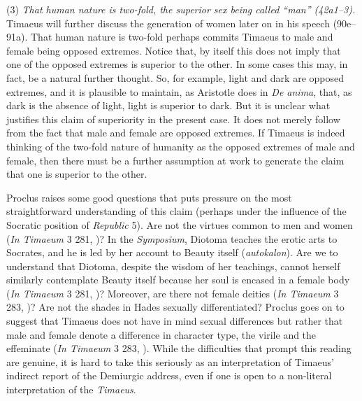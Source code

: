 (3) \emph{That human nature is two-fold, the superior sex being called ``man'' (42a1--3).} Timaeus will further discuss the generation of women later on in his speech (90e--91a). That human nature is two-fold perhaps commits Timaeus to male and female being opposed extremes. Notice that, by itself this does not imply that one of the opposed extremes is superior to the other. In some cases this may, in fact, be a natural further thought. So, for example, light and dark are opposed extremes, and it is plausible to maintain, as Aristotle does in \emph{De anima}, that, as dark is the absence of light, light is superior to dark. But it is unclear what justifies this claim of superiority in the present case. It does not merely follow from the fact that male and female are opposed extremes. If Timaeus is indeed thinking of the two-fold nature of humanity as the opposed extremes of male and female, then there must be a further assumption at work to generate the claim that one is superior to the other.

Proclus raises some good questions that puts pressure on the most straightforward understanding of this claim (perhaps under the influence of the Socratic position of \emph{Republic} 5). Are not the virtues common to men and women (\emph{In Timaeum} 3 281, \citealt{Diehl:1903re})? In the \emph{Symposium}, Diotoma teaches the erotic arts to Socrates, and he is led by her account to Beauty itself (\emph{autokalon}). Are we to understand that Diotoma, despite the wisdom of her teachings, cannot herself similarly contemplate Beauty itself because her soul is encased in a female body (\emph{In Timaeum} 3 281, \citealt{Diehl:1903re})? Moreover, are there not female deities (\emph{In Timaeum} 3 283, \citealt{Diehl:1903re})? Are not the shades in Hades sexually differentiated? Proclus goes on to suggest that Timaeus does not have in mind sexual differences but rather that male and female denote a difference in character type, the virile and the effeminate (\emph{In Timaeum} 3 283, \citealt{Diehl:1903re}). While the difficulties that prompt this reading are genuine, it is hard to take this seriously as an interpretation of Timaeus' indirect report of the Demiurgic address, even if one is open to a non-literal interpretation of the \emph{Timaeus}.

